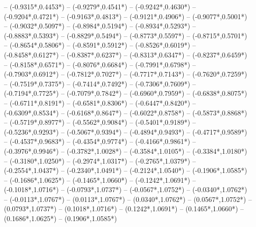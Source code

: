 {	-- ({-0.9315*\dx},{0.4453*\dy})
	-- ({-0.9279*\dx},{0.4541*\dy})
	-- ({-0.9242*\dx},{0.4630*\dy})
	-- ({-0.9204*\dx},{0.4721*\dy})
	-- ({-0.9163*\dx},{0.4813*\dy})
	-- ({-0.9121*\dx},{0.4906*\dy})
	-- ({-0.9077*\dx},{0.5001*\dy})
	-- ({-0.9032*\dx},{0.5097*\dy})
	-- ({-0.8984*\dx},{0.5194*\dy})
	-- ({-0.8934*\dx},{0.5293*\dy})
	-- ({-0.8883*\dx},{0.5393*\dy})
	-- ({-0.8829*\dx},{0.5494*\dy})
	-- ({-0.8773*\dx},{0.5597*\dy})
	-- ({-0.8715*\dx},{0.5701*\dy})
	-- ({-0.8654*\dx},{0.5806*\dy})
	-- ({-0.8591*\dx},{0.5912*\dy})
	-- ({-0.8526*\dx},{0.6019*\dy})
	-- ({-0.8458*\dx},{0.6127*\dy})
	-- ({-0.8387*\dx},{0.6237*\dy})
	-- ({-0.8313*\dx},{0.6347*\dy})
	-- ({-0.8237*\dx},{0.6459*\dy})
	-- ({-0.8158*\dx},{0.6571*\dy})
	-- ({-0.8076*\dx},{0.6684*\dy})
	-- ({-0.7991*\dx},{0.6798*\dy})
	-- ({-0.7903*\dx},{0.6912*\dy})
	-- ({-0.7812*\dx},{0.7027*\dy})
	-- ({-0.7717*\dx},{0.7143*\dy})
	-- ({-0.7620*\dx},{0.7259*\dy})
	-- ({-0.7519*\dx},{0.7375*\dy})
	-- ({-0.7414*\dx},{0.7492*\dy})
	-- ({-0.7306*\dx},{0.7609*\dy})
	-- ({-0.7194*\dx},{0.7725*\dy})
	-- ({-0.7079*\dx},{0.7842*\dy})
	-- ({-0.6960*\dx},{0.7959*\dy})
	-- ({-0.6838*\dx},{0.8075*\dy})
	-- ({-0.6711*\dx},{0.8191*\dy})
	-- ({-0.6581*\dx},{0.8306*\dy})
	-- ({-0.6447*\dx},{0.8420*\dy})
	-- ({-0.6309*\dx},{0.8534*\dy})
	-- ({-0.6168*\dx},{0.8647*\dy})
	-- ({-0.6022*\dx},{0.8758*\dy})
	-- ({-0.5873*\dx},{0.8868*\dy})
	-- ({-0.5719*\dx},{0.8977*\dy})
	-- ({-0.5562*\dx},{0.9084*\dy})
	-- ({-0.5401*\dx},{0.9189*\dy})
	-- ({-0.5236*\dx},{0.9293*\dy})
	-- ({-0.5067*\dx},{0.9394*\dy})
	-- ({-0.4894*\dx},{0.9493*\dy})
	-- ({-0.4717*\dx},{0.9589*\dy})
	-- ({-0.4537*\dx},{0.9683*\dy})
	-- ({-0.4354*\dx},{0.9774*\dy})
	-- ({-0.4166*\dx},{0.9861*\dy})
	-- ({-0.3976*\dx},{0.9946*\dy})
	-- ({-0.3782*\dx},{1.0028*\dy})
	-- ({-0.3584*\dx},{1.0105*\dy})
	-- ({-0.3384*\dx},{1.0180*\dy})
	-- ({-0.3180*\dx},{1.0250*\dy})
	-- ({-0.2974*\dx},{1.0317*\dy})
	-- ({-0.2765*\dx},{1.0379*\dy})
	-- ({-0.2554*\dx},{1.0437*\dy})
	-- ({-0.2340*\dx},{1.0491*\dy})
	-- ({-0.2124*\dx},{1.0540*\dy})
	-- ({-0.1906*\dx},{1.0585*\dy})
	-- ({-0.1686*\dx},{1.0625*\dy})
	-- ({-0.1465*\dx},{1.0660*\dy})
	-- ({-0.1242*\dx},{1.0691*\dy})
	-- ({-0.1018*\dx},{1.0716*\dy})
	-- ({-0.0793*\dx},{1.0737*\dy})
	-- ({-0.0567*\dx},{1.0752*\dy})
	-- ({-0.0340*\dx},{1.0762*\dy})
	-- ({-0.0113*\dx},{1.0767*\dy})
	-- ({0.0113*\dx},{1.0767*\dy})
	-- ({0.0340*\dx},{1.0762*\dy})
	-- ({0.0567*\dx},{1.0752*\dy})
	-- ({0.0793*\dx},{1.0737*\dy})
	-- ({0.1018*\dx},{1.0716*\dy})
	-- ({0.1242*\dx},{1.0691*\dy})
	-- ({0.1465*\dx},{1.0660*\dy})
	-- ({0.1686*\dx},{1.0625*\dy})
	-- ({0.1906*\dx},{1.0585*\dy})
}
